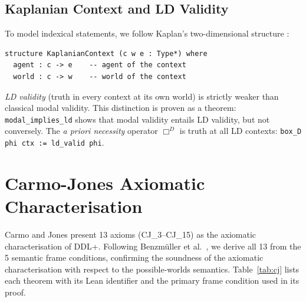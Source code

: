 \documentclass[]{article}
\newcommand{\code}[1]{\texttt{#1}}
\newcommand{\DDL}{\textup{DDL+}}
\begin{document}
\subsection{Kaplanian Context and LD Validity}

To model indexical statements, we follow Kaplan's two-dimensional structure \cite{Kaplan1989}:

\begin{lstlisting}
structure KaplanianContext (c w e : Type*) where
  agent : c -> e    -- agent of the context
  world : c -> w    -- world of the context
\end{lstlisting}

\noindent
\emph{LD validity} (truth in every context at its own world) is strictly weaker
than classical modal validity.
This distinction is proven as a theorem:
\code{modal\_implies\_ld} shows that modal validity entails LD validity, but not conversely.
The \emph{a priori necessity} operator $\Box^D$ is truth at all LD contexts:
\code{box\_D phi ctx := ld\_valid phi}.

\section{Carmo-Jones Axiomatic Characterisation}
\label{sec:cj}

Carmo and Jones \cite{CarmoJones2002} present 13 axioms (CJ\_3--CJ\_15) as the
axiomatic characterisation of \DDL{}.  Following Benzm{\"u}ller et al.\
\cite{Benzmuller2018}, we derive all 13 from the 5 semantic frame conditions,
confirming the soundness of the axiomatic characterisation with respect to
the possible-worlds semantics.
Table~\ref{tab:cj} lists each theorem with its Lean identifier and the
primary frame condition used in its proof.
\end{document}
